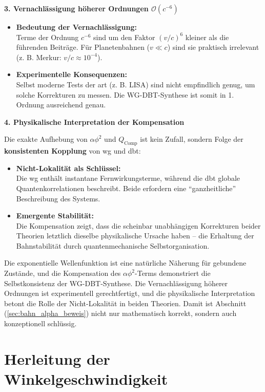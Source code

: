 \textbf{3. Vernachlässigung höherer Ordnungen $\mathcal{O}(c^{-6})$}

\begin{itemize}
    \item \textbf{Bedeutung der Vernachlässigung:}\\Terme der Ordnung $c^{-6}$ sind um den Faktor $(v/c)^{6}$ kleiner als die führenden Beiträge. Für Planetenbahnen ($v \ll c$) sind sie praktisch irrelevant (z. B. Merkur: $v/c \approx 10^{-4}$).
    \item \textbf{Experimentelle Konsequenzen:}\\Selbst moderne Tests der \gls{art} (z. B. LISA) sind nicht empfindlich genug, um solche Korrekturen zu messen. Die WG-DBT-Synthese ist somit in 1. Ordnung ausreichend genau.
\end{itemize}

\textbf{4. Physikalische Interpretation der Kompensation}

Die exakte Aufhebung von $\alpha \phi^{2}$ und $Q_\text{Comp}$ ist kein Zufall, sondern Folge der \textbf{konsistenten Kopplung} von \gls{wg} und \gls{dbt}:
\begin{itemize}
    \item \textbf{Nicht-Lokalität als Schlüssel:}\\Die \gls{wg} enthält instantane Fernwirkungsterme, während die \gls{dbt} globale Quantenkorrelationen beschreibt. Beide erfordern eine \enquote{ganzheitliche} Beschreibung des Systems.
    \item \textbf{Emergente Stabilität:}\\Die Kompensation zeigt, dass die scheinbar unabhängigen Korrekturen beider Theorien letztlich dieselbe physikalische Ursache haben – die Erhaltung der Bahnstabilität durch quantenmechanische Selbstorganisation.
\end{itemize}

Die exponentielle Wellenfunktion ist eine natürliche Näherung für gebundene Zustände, und die Kompensation des $\alpha \phi^{2}$-Terms demonstriert die Selbstkonsistenz der WG-DBT-Synthese.
Die Vernachlässigung höherer Ordnungen ist experimentell gerechtfertigt, und die physikalische Interpretation betont die Rolle der Nicht-Lokalität in beiden Theorien. Damit ist
Abschnitt (\ref{sec:bahn_alpha_beweis}) nicht nur mathematisch korrekt, sondern auch konzeptionell schlüssig.

\section{Herleitung der Winkelgeschwindigkeit}
\label{sec:angular_velocity}

